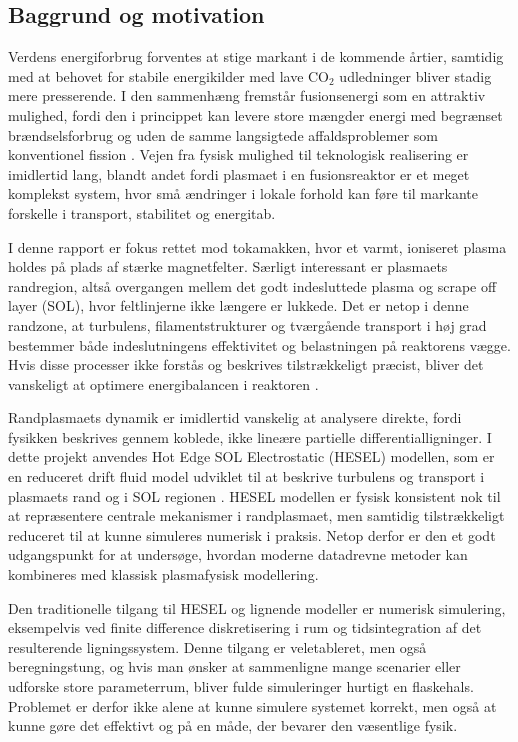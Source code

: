 \subsection{Baggrund og motivation}

Verdens energiforbrug forventes at stige markant i de kommende årtier, samtidig med at behovet for stabile energikilder med lave CO$_2$ udledninger bliver stadig mere presserende.
I den sammenhæng fremstår fusionsenergi som en attraktiv mulighed, fordi den i princippet kan levere store mængder energi med begrænset brændselsforbrug
og uden de samme langsigtede affaldsproblemer som konventionel fission \cite{iter_new_energy}.
Vejen fra fysisk mulighed til teknologisk realisering er imidlertid lang, blandt andet fordi plasmaet i en fusionsreaktor er et meget komplekst system, hvor små ændringer i lokale forhold kan føre til markante forskelle i transport, stabilitet og energitab.

I denne rapport er fokus rettet mod tokamakken, hvor et varmt, ioniseret plasma holdes på plads af stærke magnetfelter.
Særligt interessant er plasmaets randregion, altså overgangen mellem det godt indesluttede plasma og scrape off layer (SOL), hvor feltlinjerne ikke længere er lukkede.
Det er netop i denne randzone, at turbulens, filamentstrukturer og tværgående transport i høj grad bestemmer både indeslutningens effektivitet og belastningen på reaktorens vægge.
Hvis disse processer ikke forstås og beskrives tilstrækkeligt præcist, bliver det vanskeligt at optimere energibalancen i reaktoren \cite{plasma_particle_sources,num_sim_blobs}.

Randplasmaets dynamik er imidlertid vanskelig at analysere direkte, fordi fysikken beskrives gennem koblede, ikke lineære partielle differentialligninger.
I dette projekt anvendes Hot Edge SOL Electrostatic (HESEL) modellen, som er en reduceret drift fluid model udviklet til at beskrive turbulens og transport
i plasmaets rand og i SOL regionen \cite{udledning_af_hesel,num_sim_blobs}.
HESEL modellen er fysisk konsistent nok til at repræsentere centrale mekanismer i randplasmaet, men samtidig tilstrækkeligt reduceret til at kunne simuleres numerisk i praksis.
Netop derfor er den et godt udgangspunkt for at undersøge, hvordan moderne datadrevne metoder kan kombineres med klassisk plasmafysisk modellering.

Den traditionelle tilgang til HESEL og lignende modeller er numerisk simulering, eksempelvis ved finite difference diskretisering i rum og tidsintegration af det resulterende ligningssystem.
Denne tilgang er veletableret, men også beregningstung, og hvis man ønsker at sammenligne mange scenarier eller udforske store parameterrum, bliver fulde simuleringer hurtigt en flaskehals.
Problemet er derfor ikke alene at kunne simulere systemet korrekt, men også at kunne gøre det effektivt og på en måde, der bevarer den væsentlige fysik.

